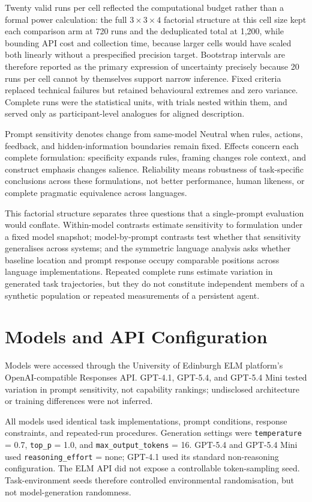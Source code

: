 \documentclass[logo,msc,inf]{infthesis}       %
\begin{document}
Twenty valid runs per cell reflected the computational budget rather than a formal power calculation: the full $3\times3\times4$ factorial structure at this cell size kept each comparison arm at 720 runs and the deduplicated total at 1,200, while bounding API cost and collection time, because larger cells would have scaled both linearly without a prespecified precision target. Bootstrap intervals are therefore reported as the primary expression of uncertainty precisely because 20 runs per cell cannot by themselves support narrow inference. Fixed criteria replaced technical failures but retained behavioural extremes and zero variance. Complete runs were the statistical units, with trials nested within them, and served only as participant-level analogues for aligned description.

Prompt sensitivity denotes change from same-model Neutral when rules, actions, feedback, and hidden-information boundaries remain fixed. Effects concern each complete formulation: specificity expands rules, framing changes role context, and construct emphasis changes salience. Reliability means robustness of task-specific conclusions across these formulations, not better performance, human likeness, or complete pragmatic equivalence across languages.

This factorial structure separates three questions that a single-prompt evaluation would conflate. Within-model contrasts estimate sensitivity to formulation under a fixed model snapshot; model-by-prompt contrasts test whether that sensitivity generalises across systems; and the symmetric language analysis asks whether baseline location and prompt response occupy comparable positions across language implementations. Repeated complete runs estimate variation in generated task trajectories, but they do not constitute independent members of a synthetic population or repeated measurements of a persistent agent.

\section{Models and API Configuration}

Models were accessed through the University of Edinburgh ELM platform's OpenAI-compatible Responses API. GPT-4.1, GPT-5.4, and GPT-5.4 Mini tested variation in prompt sensitivity, not capability rankings; undisclosed architecture or training differences were not inferred.

All models used identical task implementations, prompt conditions, response constraints, and repeated-run procedures. Generation settings were \texttt{temperature} = 0.7, \texttt{top\_p} = 1.0, and \texttt{max\_output\_tokens} = 16. GPT-5.4 and GPT-5.4 Mini used \texttt{reasoning\_effort} = none; GPT-4.1 used its standard non-reasoning configuration. The ELM API did not expose a controllable token-sampling seed. Task-environment seeds therefore controlled environmental randomisation, but not model-generation randomness.
\end{document}
